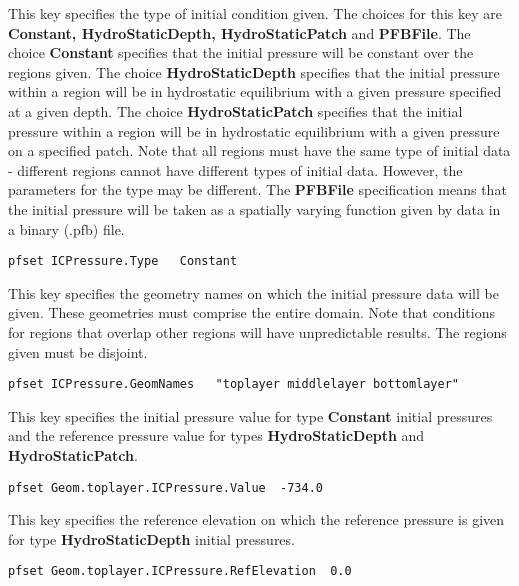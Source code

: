 {This key specifies the type of initial condition given.  The choices for this
key are {\bf Constant, HydroStaticDepth, HydroStaticPatch} and {\bf PFBFile}.
The choice {\bf Constant} specifies that the initial pressure will be constant
over the regions given.  The choice {\bf HydroStaticDepth} specifies that the
initial pressure within a region
will be in hydrostatic equilibrium with a given pressure
specified at a given depth.  The choice {\bf HydroStaticPatch} specifies that
the initial pressure within a region
will be in hydrostatic equilibrium with a given pressure on a specified patch.
Note that all regions must have the same type of initial data - different
regions cannot have different types of initial data.  However, the parameters
for the type may be different.
The {\bf PFBFile} specification means that the initial pressure
will be taken as a spatially varying function given by data in a
\parflow{} binary (.pfb) file.
}
\begin{display}\begin{verbatim}
pfset ICPressure.Type   Constant
\end{verbatim}\end{display}

{This key specifies the geometry names on which the initial pressure data will
be given.  These geometries must comprise the entire domain.
Note that conditions for regions that overlap other regions will have
unpredictable results.  The regions given must be disjoint.
}
\begin{display}\begin{verbatim}
pfset ICPressure.GeomNames   "toplayer middlelayer bottomlayer"
\end{verbatim}\end{display}

{This key specifies the initial pressure value for type {\bf Constant} initial
pressures and the reference pressure value for types {\bf HydroStaticDepth} and
{\bf HydroStaticPatch}.
}
\begin{display}\begin{verbatim}
pfset Geom.toplayer.ICPressure.Value  -734.0
\end{verbatim}\end{display}

{This key specifies the reference elevation on which the reference pressure is
given for type {\bf HydroStaticDepth} initial pressures.
}
\begin{display}\begin{verbatim}
pfset Geom.toplayer.ICPressure.RefElevation  0.0
\end{verbatim}\end{display}

